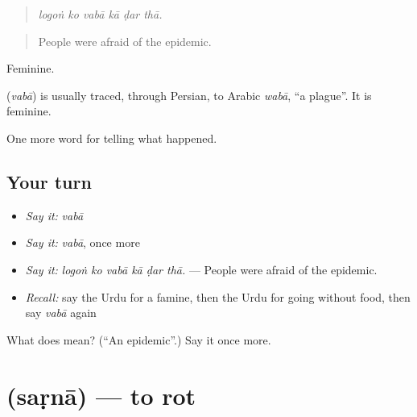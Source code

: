 \begin{quote}
     
\end{quote}

\begin{quote}
\emph{logoṅ ko vabā kā ḍar thā.}
\end{quote}

\begin{quote}
People were afraid of the epidemic.
\end{quote}

Feminine.

\begin{cousinweb}
\textbf{} (\emph{vabā}) is usually traced, through Persian, to Arabic \emph{wabā}, \textquotedblleft{}a plague\textquotedblright{}. It is feminine.
\end{cousinweb}

\begin{grammarlens}[title={What you've built}]
One more word for telling what happened.
\end{grammarlens}

\subsection*{Your turn}
\begin{itemize}
\raggedright
  \item \emph{Say it:} \emph{vabā}
  \item \emph{Say it:} \emph{vabā}, once more
  \item \emph{Say it:} \emph{logoṅ ko vabā kā ḍar thā.} — People were afraid of the epidemic.
  \item \emph{Recall:} say the Urdu for a famine, then the Urdu for going without food, then say \emph{vabā} again
\end{itemize}

\begin{tcolorbox}[breakable,colback=teal!4,colframe=teal!35!black,title={Before you move on}]
What does  mean? (\textquotedblleft{}An epidemic\textquotedblright{}.) Say it once more.
\end{tcolorbox}
\section[\texorpdfstring{\ur{سڑنا} (saṛnā)}{سڑنا (saṛnā)}]{ (saṛnā) — to rot}

\label{lesson:UR-C294-sarna}



